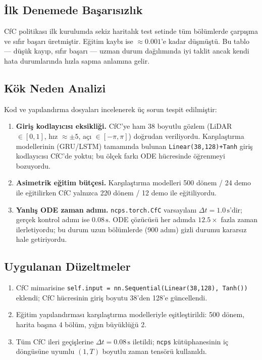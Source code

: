 \documentclass[11pt,a4paper]{article}
\newcommand{\code}[1]{\texttt{#1}}
\begin{document}
\subsection{İlk Denemede Başarısızlık}

CfC politikası ilk kurulumda sekiz haritalık test setinde tüm bölümlerde
çarpışma ve sıfır başarı üretmiştir.
Eğitim kaybı ise $\approx 0.001$'e kadar düşmüştü.
Bu tablo --- düşük kayıp, sıfır başarı --- uzman durum dağılımında iyi
taklit ancak kendi hata durumlarında hızla sapma anlamına gelir.

\subsection{Kök Neden Analizi}

Kod ve yapılandırma dosyaları incelenerek üç sorun tespit edilmiştir:

\begin{enumerate}
\item \textbf{Giriş kodlayıcısı eksikliği.}
CfC'ye ham 38 boyutlu gözlem (LiDAR $\in[0,1]$, hız $\approx\pm5$,
açı $\in[-\pi,\pi]$) doğrudan veriliyordu.
Karşılaştırma modellerinin (GRU/LSTM) tamamında bulunan
\code{Linear(38,128)+Tanh} giriş kodlayıcısı CfC'de yoktu;
bu ölçek farkı ODE hücresinde öğrenmeyi bozuyordu.

\item \textbf{Asimetrik eğitim bütçesi.}
Karşılaştırma modelleri 500 dönem / 24 demo ile eğitilirken
CfC yalnızca 220 dönem / 12 demo ile eğitiliyordu.

\item \textbf{Yanlış ODE zaman adımı.}
\code{ncps.torch.CfC} varsayılanı $\Delta t=1.0\,\text{s}$'dir;
gerçek kontrol adımı ise $0.08\,\text{s}$.
ODE çözücüsü her adımda $12.5\times$ fazla zaman ilerletiyordu;
bu durum uzun bölümlerde (900 adım) gizli durumu kararsız hale getiriyordu.
\end{enumerate}

\subsection{Uygulanan Düzeltmeler}

\begin{enumerate}
\item CfC mimarisine \code{self.input = nn.Sequential(Linear(38,128), Tanh())}
      eklendi; CfC hücresinin giriş boyutu 38'den 128'e güncellendi.
\item Eğitim yapılandırması karşılaştırma modelleriyle eşitleştirildi:
      500 dönem, harita başına 4 bölüm, yığın büyüklüğü 2.
\item Tüm CfC ileri geçişlerine $\Delta t=0.08\,\text{s}$ iletildi;
      \code{ncps} kütüphanesinin iç döngüsüne uyumlu $(1, T)$ boyutlu
      zaman tensörü kullanıldı.
\end{enumerate}
\end{document}
